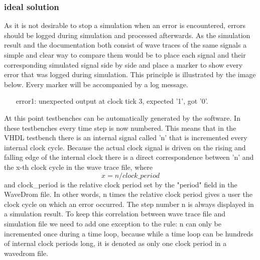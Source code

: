 \subsubsection{ideal solution}\label{TD:ideal_solution}
As it is not desirable to stop a simulation when an error is encountered, errors should be logged during simulation and processed afterwards. As the simulation result and the documentation both consist of wave traces of the same signals a simple and clear way to compare them would be to place each signal and their corresponding simulated signal side by side and place a marker to show every error that was logged during simulation. This principle is illustrated by the image below.
\newpage\noindent
Every marker will be accompanied by a log message.
\begin{customenv}
	\label{log:example}
	\begin{itemize}
		\centering
		\item [error1:] unexpected output at clock tick 3, expected '1', got '0'.
	\end{itemize}
\end{customenv}\nline
At this point testbenches can be automatically generated by the software. In these testbenches every time step is now numbered. This means that in the VHDL testbench there is an internal signal called 'n' that is incremented every internal clock cycle. Because the actual clock signal is driven on the rising and falling edge of the internal clock there is a direct correspondence between 'n' and the x-th clock cycle in the wave trace file, where
\begin{equation}
	x = n/clock\_period
\end{equation}
and clock\_period is the relative clock period set by the "period" field in the WaveDrom file. In other words, n times the relative clock period gives a user the clock cycle on which an error occurred. The step number n is always displayed in a simulation result.
\npar
To keep this correlation between wave trace file and simulation file we need to add one exception to the rule: n can only be incremented once during a time loop, because while a time loop can be hundreds of internal clock periods long, it is denoted as only one clock period in a wavedrom file.

